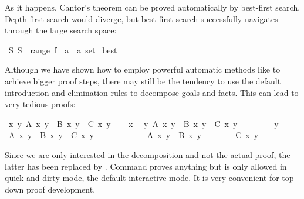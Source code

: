 \begin{isabellebody}
\begin{isamarkuptext}
As it happens, Cantor's theorem can be proved automatically by best-first
search. Depth-first search would diverge, but best-first search successfully
navigates through the large search space:%
\end{isamarkuptext}%
\isamarkupfalse%
\ {\isachardoublequote}{\isasymexists}S{\isachardot}\ S\ {\isasymnotin}\ range\ {\isacharparenleft}f\ {\isacharcolon}{\isacharcolon}\ {\isacharprime}a\ {\isasymRightarrow}\ {\isacharprime}a\ set{\isacharparenright}{\isachardoublequote}\isanewline
%
\isadelimproof
%
\endisadelimproof
%
\isatagproof
\isamarkupfalse%
\ best%
\endisatagproof
{\isafoldproof}%
%
\isadelimproof
%
\endisadelimproof
\isamarkuptrue%
%
\isamarkuptrue%
%
\begin{isamarkuptext}%
Although we have shown how to employ powerful automatic methods like
 to achieve bigger proof steps, there may still be the
tendency to use the default introduction and elimination rules to
decompose goals and facts. This can lead to very tedious proofs:%
\end{isamarkuptext}%
%
\isadelimML
%
\endisadelimML
%
\isatagML
%
\endisatagML
{\isafoldML}%
%
\isadelimML
%
\endisadelimML
\isamarkupfalse%
\ {\isachardoublequote}{\isasymforall}x\ y{\isachardot}\ A\ x\ y\ {\isasymand}\ B\ x\ y\ {\isasymlongrightarrow}\ C\ x\ y{\isachardoublequote}\isanewline
%
\isadelimproof
%
\endisadelimproof
%
\isatagproof
\isamarkupfalse%
\isanewline
\ \ \isamarkupfalse%
\ x\ \isamarkupfalse%
\ {\isachardoublequote}{\isasymforall}y{\isachardot}\ A\ x\ y\ {\isasymand}\ B\ x\ y\ {\isasymlongrightarrow}\ C\ x\ y{\isachardoublequote}\isanewline
\ \ \isamarkupfalse%
\isanewline
\ \ \ \ \isamarkupfalse%
\ y\ \isamarkupfalse%
\ {\isachardoublequote}A\ x\ y\ {\isasymand}\ B\ x\ y\ {\isasymlongrightarrow}\ C\ x\ y{\isachardoublequote}\isanewline
\ \ \ \ \isamarkupfalse%
\isanewline
\ \ \ \ \ \ \isamarkupfalse%
\ {\isachardoublequote}A\ x\ y\ {\isasymand}\ B\ x\ y{\isachardoublequote}\isanewline
\ \ \ \ \ \ \isamarkupfalse%
\ {\isachardoublequote}C\ x\ y{\isachardoublequote}\ \isamarkupfalse%
\isanewline
\ \ \ \ \isamarkupfalse%
\isanewline
\ \ \isamarkupfalse%
\isanewline
\isamarkupfalse%
%
\endisatagproof
{\isafoldproof}%
%
\isadelimproof
%
\endisadelimproof
\isamarkuptrue%
%
\begin{isamarkuptext}%
\noindent Since we are only interested in the decomposition and not the
actual proof, the latter has been replaced by
. Command  proves anything but is
only allowed in quick and dirty mode, the default interactive mode. It
is very convenient for top down proof development.


\end{isamarkuptext}
\end{isabellebody}
